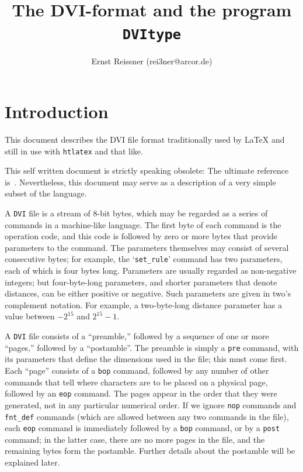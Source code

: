 \documentclass[10pt, a4paper, english]{article}
\title{The DVI-format and the program \texttt{DVItype}}
\author{Ernst Reissner (rei3ner@arcor.de)}
\date{\Today}
\begin{document}
\maketitle
\tableofcontents

\section{Introduction}
This document describes the DVI file format 
traditionally used by \LaTeX{} 
and still in use with \texttt{htlatex} and that like. 

This self written document is strictly speaking obsolete: 
The ultimate reference is~\cite{DviType}. 
Nevertheless, this document may serve as a description of a very simple subset of the language. 

A \texttt{DVI} file is a stream of 8-bit bytes, which may be regarded as a
series of commands in a machine-like language. The first byte of each command
is the operation code, and this code is followed by zero or more bytes
that provide parameters to the command. The parameters themselves may consist
of several consecutive bytes; 
for example, the `\texttt{set\_rule}' command has two
parameters, each of which is four bytes long. Parameters are usually
regarded as non-negative integers; but four-byte-long parameters,
and shorter parameters that denote distances, can be
either positive or negative. Such parameters are given in two's complement
notation. For example, a two-byte-long distance parameter has a value between
$-2^{15}$ and $2^{15}-1$.


A \texttt{DVI} file consists of a ``preamble,'' 
followed by a sequence of one or more ``pages,'' 
followed by a ``postamble''. 
The preamble is simply a \texttt{pre} command, 
with its parameters that define the dimensions used in the file; 
this must come first.  
Each ``page'' consists of a \texttt{bop} command,
followed by any number of other commands that tell where characters are to
be placed on a physical page, followed by an \texttt{eop} command. 
The pages appear in the order that they were generated, 
not in any particular numerical order. 
If we ignore \texttt{nop} commands and \texttt{fnt\_def} commands
(which are allowed between any two commands in the file), 
each \texttt{eop} command is immediately followed by a \texttt{bop} command, 
or by a \texttt{post} command; 
in the latter case, there are no more pages in the file, 
and the remaining bytes form the postamble.  
Further details about the postamble will be explained later.
\end{document}

